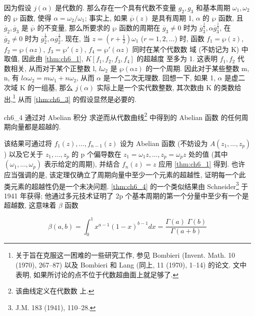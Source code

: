 因为假设 $j(\alpha)$ 是代数的. 那么存在一个具有代数不变量 $g_2, g_3$ 和基本周期 $\omega_1, \omega_2$ 的 $\wp$ 函数, 使得 $\alpha = \omega_2/\omega_1$; 事实上, 如果 $\overline{\wp}(z)$ 是具有周期 1, $\alpha$ 的 $\wp$ 函数, 且 $\overline{g}_2, \overline{g}_3$ 是 $\overline{\wp}$ 的不变量, 那么所要求的 $\wp$ 函数的周期在 $\overline{g}_3 \neq 0$ 时为 $\overline{g}_3^{\frac{1}{3}}, \alpha \overline{g}_3^{\frac{1}{3}}$, 在 $\overline{g}_2 \neq 0$ 时为 $\overline{g}_2^{\frac{1}{2}}, \alpha \overline{g}_2^{\frac{1}{2}}$. 现在, 当 $z = (r + \frac{1}{2})\omega_1$ ($r = 1, 2, \ldots$) 时, 函数 $f_1 = \wp(z)$, $f_2 = \wp(\alpha z)$, $f_3 = \wp'(z)$, $f_4 = \wp'(\alpha z)$ 同时在某个代数数 域 (不妨记为 K) 中取值, 因此由 \autoref{thm:ch6_1}, $K[f_1, f_2, f_3, f_4]$ 的超越度 至多为 1. 这表明 $f_1, f_2$ 代数相关, 从而对于某个正整数 l, $l\omega_2$ 是 $\wp(\alpha z)$ 的一个周期. 因此对于某些整数 m, n, 有 $l\alpha \omega_2 = m\omega_1 + n\omega_2$, 从而 $\alpha$ 是一个二次无理数. 回想一下, 如果 1, $\alpha$ 是虚二次域 K 的一组基, 那么 $j(\alpha)$ 实际上是一个实代数整数, 其次数由 K 的类数给出,\footnote{关于旨在克服这一困难的一些研究工作, 参见 Bombieri (Invent. Math. 10 (1970), 267--87) 以及 Bombieri 和 Lang (同上, 11 (1970), 1--14) 的论文. 文中表明, 如果所讨论的点不位于代数超曲面上就足够了.} 从而 \autoref{thm:ch6_3} 的假设显然是必要的.

\begin{mythm}{}{ch6_4}
通过对 Abelian 积分 求逆而从代数曲线\footnote{该曲线定义在代数数 上.} 中得到的 Abelian 函数 的任何周期向量都是超越的.
\end{mythm}

该结果可通过将 $f_1(z), \dots, f_{n-1}(z)$ 设为 Abelian 函数 (不妨设为 $A(z_1, \dots, z_p)$) 以及它关于 $z_1, \dots, z_p$ 的 p 个偏导数在 $z_1 = \omega_1 z, \dots, z_p = \omega_p z$ 处的值 (其中 $(\omega_1, \dots, \omega_p)$ 表示给定的周期), 并结合 $f_n(z) = z$ 应用 \autoref{thm:ch6_1} 得到. 也许应当强调的是, 该定理仅确立了周期向量中至少一个元素的超越性, 证明每一个此类元素的超越性仍是一个未决问题. \autoref{thm:ch6_4} 的一个类似结果由 Schneider\footnote{J.M. 183 (1941), 110--28.} 于 1941 年获得; 他通过多元技术证明了 2p 个基本周期的第一个分量中至少有一个是超越数, 这意味着 $\beta$ 函数

\[\beta(a,b) = \int_0^1 x^{a-1} (1-x)^{b-1} dx = \frac{\Gamma(a) \; \Gamma(b)}{\Gamma(a+b)}\]

